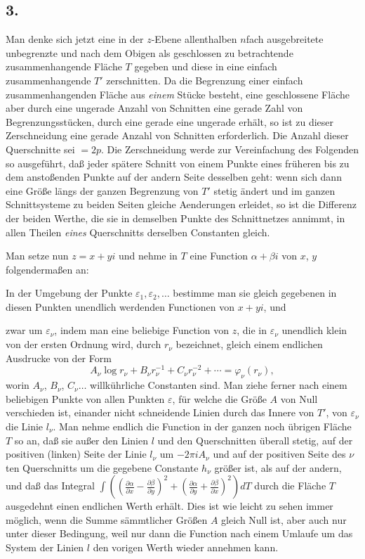 \documentclass{article}
\begin{document}
\subsection*{3.}

Man denke sich jetzt eine in der $z$-Ebene allenthalben $n$fach ausgebreitete unbegrenzte und nach dem Obigen als geschlossen zu betrachtende zusammenhangende Fläche $T$ gegeben und diese in eine einfach zusammenhangende $T'$ zerschnitten. Da die Begrenzung einer einfach zusammenhangenden Fläche aus \emph{einem} Stücke besteht, eine geschlossene Fläche aber durch eine ungerade Anzahl von Schnitten eine gerade Zahl von Begrenzungsstücken, durch eine gerade eine ungerade erhält, so ist zu dieser Zerschneidung eine gerade Anzahl von Schnitten erforderlich. Die Anzahl dieser Querschnitte sei $= 2p$. Die Zerschneidung werde zur Vereinfachung des Folgenden so ausgeführt, daß jeder spätere Schnitt von einem Punkte eines früheren bis zu dem anstoßenden Punkte auf der andern Seite desselben geht: wenn sich dann eine Größe längs der ganzen Begrenzung von $T'$ stetig ändert und im ganzen Schnittsysteme zu beiden Seiten gleiche Aenderungen erleidet, so ist die Differenz der beiden Werthe, die sie in demselben Punkte des Schnittnetzes annimmt, in allen Theilen \emph{eines} Querschnitts derselben Constanten gleich.

Man setze nun $z = x + yi$ und nehme in $T$ eine Function $\alpha + \beta i$ von $x$, $y$ folgendermaßen an:

In der Umgebung der Punkte $\varepsilon_{1}, \varepsilon_{2}, \ldots$ bestimme man sie gleich gegebenen in diesen Punkten unendlich werdenden Functionen von $x + yi$, und

zwar um $\varepsilon_{\nu}$, indem man eine beliebige Function von $z$, die in $\varepsilon_{\nu}$ unendlich klein von der ersten Ordnung wird, durch $r_{\nu}$ bezeichnet, gleich einem endlichen Ausdrucke von der Form
\[ A_{\nu} \log r_{\nu} + B_{\nu} r_{\nu}^{-1} + C_{\nu} r_{\nu}^{-2} + \cdots = \varphi_{\nu}(r_{\nu}), \]
worin $A_{\nu}$, $B_{\nu}$, $C_{\nu} \ldots$ willkührliche Constanten sind. Man ziehe ferner nach einem beliebigen Punkte von allen Punkten $\varepsilon$, für welche die Größe $A$ von Null verschieden ist, einander nicht schneidende Linien durch das Innere von $T'$, von $\varepsilon_{\nu}$ die Linie $l_{\nu}$. Man nehme endlich die Function in der ganzen noch übrigen Fläche $T$ so an, daß sie außer den Linien $l$ und den Querschnitten überall stetig, auf der positiven (linken) Seite der Linie $l_{\nu}$ um $-2\pi i A_{\nu}$ und auf der positiven Seite des $\nu$ten Querschnitts um die gegebene Constante $h_{\nu}$ größer ist, als auf der andern, und daß das Integral $\displaystyle\int \left(\left(\frac{\partial\alpha}{\partial x} - \frac{\partial\beta}{\partial y}\right)^{2} + \left(\frac{\partial\alpha}{\partial y} + \frac{\partial\beta}{\partial x}\right)^{2}\right) dT$ durch die Fläche $T$ ausgedehnt einen endlichen Werth erhält. Dies ist wie leicht zu sehen immer möglich, wenn die Summe sämmtlicher Größen $A$ gleich Null ist, aber auch nur unter dieser Bedingung, weil nur dann die Function nach einem Umlaufe um das System der Linien $l$ den vorigen Werth wieder annehmen kann.
\end{document}
